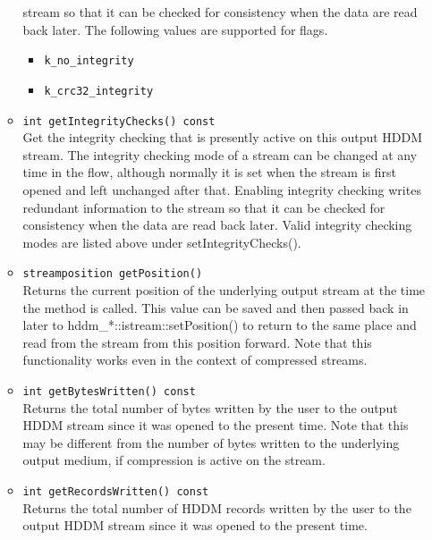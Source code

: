 \documentclass{revtex4}
\begin{document}
\begin{itemize}
\begin{itemize}
stream so that it can be checked for consistency when the data are read back
later. The following values are supported for flags.
\begin{itemize}
\item \texttt{k\_no\_integrity}
\item \texttt{k\_crc32\_integrity}
\end{itemize}
\item \texttt{int getIntegrityChecks() const}\\
Get the integrity checking that is presently active on this output HDDM stream.
The integrity checking mode of a stream can be changed at any time in the flow,
although normally it is set when the stream is first opened and left unchanged
after that. Enabling integrity checking writes redundant information to the
stream so that it can be checked for consistency when the data are read back
later. Valid integrity checking modes are listed above under
setIntegrityChecks().
\item \texttt{streamposition getPosition()}\\
Returns the current position of the underlying output stream at the time the
method is called. This value can be saved and then passed back in later to
hddm\_*::istream::setPosition() to return to the same place and read from the
stream from this position forward. Note that this functionality works even in
the context of compressed streams.
\item \texttt{int getBytesWritten() const}\\
Returns the total number of bytes written by the user to the output HDDM stream
since it was opened to the present time. Note that this may be different from
the number of bytes written to the underlying output medium, if compression is
active on the stream.
\item \texttt{int getRecordsWritten() const}\\
Returns the total number of HDDM records written by the user to the output HDDM
stream since it was opened to the present time.
\end{itemize}


\end{itemize}
\end{document}
